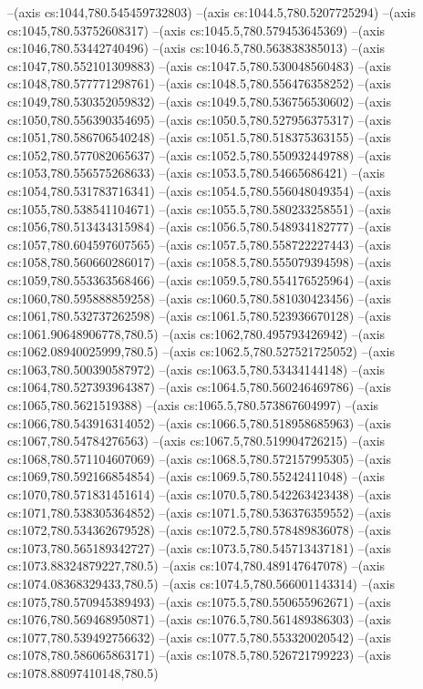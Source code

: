 --(axis cs:1044,780.545459732803)
--(axis cs:1044.5,780.5207725294)
--(axis cs:1045,780.53752608317)
--(axis cs:1045.5,780.579453645369)
--(axis cs:1046,780.53442740496)
--(axis cs:1046.5,780.563838385013)
--(axis cs:1047,780.552101309883)
--(axis cs:1047.5,780.530048560483)
--(axis cs:1048,780.577771298761)
--(axis cs:1048.5,780.556476358252)
--(axis cs:1049,780.530352059832)
--(axis cs:1049.5,780.536756530602)
--(axis cs:1050,780.556390354695)
--(axis cs:1050.5,780.527956375317)
--(axis cs:1051,780.586706540248)
--(axis cs:1051.5,780.518375363155)
--(axis cs:1052,780.577082065637)
--(axis cs:1052.5,780.550932449788)
--(axis cs:1053,780.556575268633)
--(axis cs:1053.5,780.54665686421)
--(axis cs:1054,780.531783716341)
--(axis cs:1054.5,780.556048049354)
--(axis cs:1055,780.538541104671)
--(axis cs:1055.5,780.580233258551)
--(axis cs:1056,780.513434315984)
--(axis cs:1056.5,780.548934182777)
--(axis cs:1057,780.604597607565)
--(axis cs:1057.5,780.558722227443)
--(axis cs:1058,780.560660286017)
--(axis cs:1058.5,780.555079394598)
--(axis cs:1059,780.553363568466)
--(axis cs:1059.5,780.554176525964)
--(axis cs:1060,780.595888859258)
--(axis cs:1060.5,780.581030423456)
--(axis cs:1061,780.532737262598)
--(axis cs:1061.5,780.523936670128)
--(axis cs:1061.90648906778,780.5)
--(axis cs:1062,780.495793426942)
--(axis cs:1062.08940025999,780.5)
--(axis cs:1062.5,780.527521725052)
--(axis cs:1063,780.500390587972)
--(axis cs:1063.5,780.53434144148)
--(axis cs:1064,780.527393964387)
--(axis cs:1064.5,780.560246469786)
--(axis cs:1065,780.5621519388)
--(axis cs:1065.5,780.573867604997)
--(axis cs:1066,780.543916314052)
--(axis cs:1066.5,780.518958685963)
--(axis cs:1067,780.54784276563)
--(axis cs:1067.5,780.519904726215)
--(axis cs:1068,780.571104607069)
--(axis cs:1068.5,780.572157995305)
--(axis cs:1069,780.592166854854)
--(axis cs:1069.5,780.55242411048)
--(axis cs:1070,780.571831451614)
--(axis cs:1070.5,780.542263423438)
--(axis cs:1071,780.538305364852)
--(axis cs:1071.5,780.536376359552)
--(axis cs:1072,780.534362679528)
--(axis cs:1072.5,780.578489836078)
--(axis cs:1073,780.565189342727)
--(axis cs:1073.5,780.545713437181)
--(axis cs:1073.88324879227,780.5)
--(axis cs:1074,780.489147647078)
--(axis cs:1074.08368329433,780.5)
--(axis cs:1074.5,780.566001143314)
--(axis cs:1075,780.570945389493)
--(axis cs:1075.5,780.550655962671)
--(axis cs:1076,780.569468950871)
--(axis cs:1076.5,780.561489386303)
--(axis cs:1077,780.539492756632)
--(axis cs:1077.5,780.553320020542)
--(axis cs:1078,780.586065863171)
--(axis cs:1078.5,780.526721799223)
--(axis cs:1078.88097410148,780.5)
